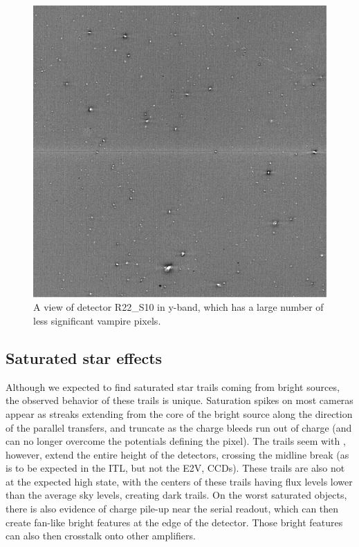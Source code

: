 \begin{figure}
  \begin{center}
  \includegraphics[width=\textwidth]{figures/isr-f04-vampire_pixels_y_det03.png}
  \caption{A view of detector R22\_S10 in y-band, which has a large number of less significant vampire pixels.}
  \end{center}
\end{figure}


\subsection{Saturated star effects}

Although we expected to find saturated star trails coming from bright sources, the observed behavior of these trails is unique.
Saturation spikes on most cameras appear as streaks extending from the core of the bright source along the direction of the parallel transfers, and truncate as the charge bleeds run out of charge (and can no longer overcome the potentials defining the pixel).
The trails seem with \ComCam, however, extend the entire height of the detectors, crossing the midline break
(as is to be expected in the ITL, but not the E2V, CCDs).
These trails are also not at the expected high state, with the centers of these trails having flux levels lower than the average sky levels, creating dark trails.
On the worst saturated objects, there is also evidence of charge pile-up near the serial readout, which can then create fan-like bright features at the edge of the detector.
Those bright features can also then crosstalk onto other amplifiers.

